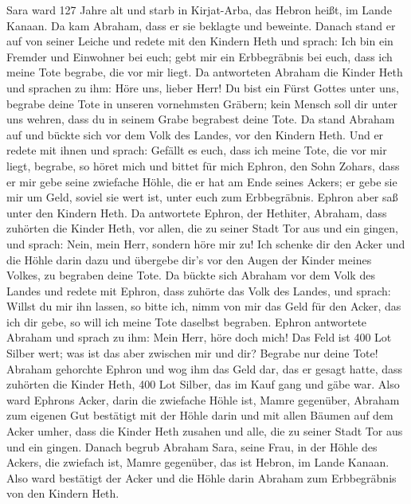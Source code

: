  Sara ward 127 Jahre alt  und starb in
Kirjat-Arba, das Hebron heißt, im Lande Kanaan. Da kam Abraham, dass er
sie beklagte und beweinte.  Danach stand er auf von seiner
Leiche und redete mit den Kindern Heth und sprach:  Ich
bin ein Fremder und Einwohner bei euch; gebt mir ein Erbbegräbnis bei
euch, dass ich meine Tote begrabe, die vor mir liegt.  Da
antworteten Abraham die Kinder Heth und sprachen zu ihm: 
Höre uns, lieber Herr! Du bist ein Fürst Gottes unter uns, begrabe deine
Tote in unseren vornehmsten Gräbern; kein Mensch soll dir unter uns
wehren, dass du in seinem Grabe begrabest deine Tote.  Da
stand Abraham auf und bückte sich vor dem Volk des Landes, vor den
Kindern Heth.  Und er redete mit ihnen und sprach: Gefällt
es euch, dass ich meine Tote, die vor mir liegt, begrabe, so höret mich
und bittet für mich Ephron, den Sohn Zohars,  dass er mir
gebe seine zwiefache Höhle, die er hat am Ende seines Ackers; er gebe
sie mir um Geld, soviel sie wert ist, unter euch zum Erbbegräbnis.
 Ephron aber saß unter den Kindern Heth. Da antwortete
Ephron, der Hethiter, Abraham, dass zuhörten die Kinder Heth, vor allen,
die zu seiner Stadt Tor aus und ein gingen, und sprach: 
Nein, mein Herr, sondern höre mir zu! Ich schenke dir den Acker und die
Höhle darin dazu und übergebe dir's vor den Augen der Kinder meines
Volkes, zu begraben deine Tote.  Da bückte sich Abraham
vor dem Volk des Landes  und redete mit Ephron, dass
zuhörte das Volk des Landes, und sprach: Willst du mir ihn lassen, so
bitte ich, nimm von mir das Geld für den Acker, das ich dir gebe, so
will ich meine Tote daselbst begraben.  Ephron antwortete
Abraham und sprach zu ihm:  Mein Herr, höre doch mich!
Das Feld ist 400 Lot Silber wert; was ist das aber zwischen mir und dir?
Begrabe nur deine Tote!  Abraham gehorchte Ephron und wog
ihm das Geld dar, das er gesagt hatte, dass zuhörten die Kinder Heth,
400 Lot Silber, das im Kauf gang und gäbe war.  Also ward
Ephrons Acker, darin die zwiefache Höhle ist, Mamre gegenüber, Abraham
zum eigenen Gut bestätigt mit der Höhle darin und mit allen Bäumen auf
dem Acker umher,  dass die Kinder Heth zusahen und alle,
die zu seiner Stadt Tor aus und ein gingen.  Danach
begrub Abraham Sara, seine Frau, in der Höhle des Ackers, die zwiefach
ist, Mamre gegenüber, das ist Hebron, im Lande Kanaan. 
Also ward bestätigt der Acker und die Höhle darin Abraham zum
Erbbegräbnis von den Kindern Heth.

